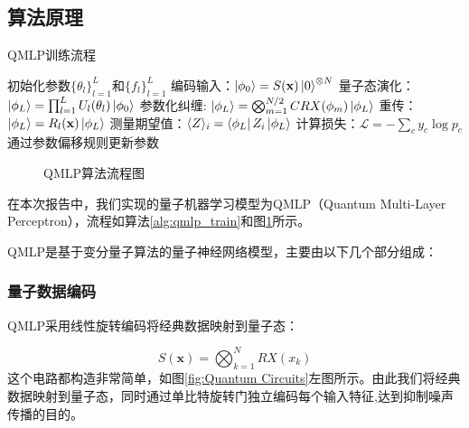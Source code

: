 \documentclass[10pt,a4paper,twoside]{article}
\numberwithin{figure}{section}%
\numberwithin{table}{section}%
\begin{document}
\subsection{算法原理}

\begin{algorithm}[H]
    \caption{QMLP训练流程}
    \label{alg:qmlp_train}
    \begin{algorithmic}[1]
    \State 初始化参数$\{\theta_l\}_{l=1}^L$和$\{f_l\}_{l=1}^L$
        \State 编码输入：$\ket{\phi_0} = S(\mathbf{x})\ket{0}^{\otimes N}$
        \State 量子态演化：$\ket{\phi_L} = \prod_{l=1}^L U_l(\theta_l)\ket{\phi_0}$
        \State 参数化纠缠: $\ket{\phi_L} = \bigotimes_{m=1}^{N/2} CRX(\phi_m)\ket{\phi_L}$
        \State 重传：$\ket{\phi_L} = R_l(\mathbf{x})\ket{\phi_L}$
        \State 测量期望值：$\langle Z\rangle_i = \bra{\phi_L} Z_i \ket{\phi_L}$
        \State 计算损失：$\mathcal{L} = -\sum_c y_c \log p_c$
        \State 通过参数偏移规则更新参数
    \EndFor
    \end{algorithmic}
\end{algorithm}

\begin{figure}[htbp]
    \centering
    \caption{QMLP算法流程图}
    \label{fig:qmlp_flow_smart}
\end{figure}
在本次报告中，我们实现的量子机器学习模型为QMLP（Quantum Multi-Layer Perceptron）\cite{chu2022qmlperrortolerantnonlinearquantum}，流程如算法\ref{alg:qmlp_train}和图\ref{fig:qmlp_flow_smart}所示。

QMLP是基于变分量子算法的量子神经网络模型，主要由以下几个部分组成：
\subsubsection{量子数据编码}

QMLP采用线性旋转编码将经典数据映射到量子态：

\begin{equation}
S(\mathbf{x}) = \bigotimes_{k=1}^N RX(x_k)
    \label{eq:linear_encoding}
\end{equation}
这个电路都构造非常简单，如图\ref{fig:Quantum Circuits}左图所示。由此我们将经典数据映射到量子态，同时通过单比特旋转门独立编码每个输入特征,达到抑制噪声传播的目的。
\end{document}
